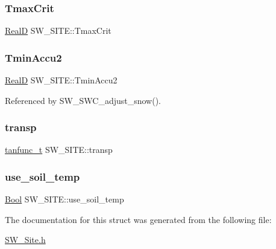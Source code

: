 \subsubsection{\texorpdfstring{Tmax\+Crit}{TmaxCrit}}
{\footnotesize\ttfamily \hyperlink{generic_8h_af1c105fd5732f70b91ddaeda0cc340e3}{RealD} S\+W\+\_\+\+S\+I\+T\+E\+::\+Tmax\+Crit}

\mbox{\label{struct_s_w___s_i_t_e_a5de1acbbf63fde3374e3c9dadfbf8e68}} 
\subsubsection{\texorpdfstring{Tmin\+Accu2}{TminAccu2}}
{\footnotesize\ttfamily \hyperlink{generic_8h_af1c105fd5732f70b91ddaeda0cc340e3}{RealD} S\+W\+\_\+\+S\+I\+T\+E\+::\+Tmin\+Accu2}



Referenced by S\+W\+\_\+\+S\+W\+C\+\_\+adjust\+\_\+snow().

\mbox{\label{struct_s_w___s_i_t_e_a1762feaaded27252b000f391a5d3259c}} 
\subsubsection{\texorpdfstring{transp}{transp}}
{\footnotesize\ttfamily \hyperlink{structtanfunc__t}{tanfunc\+\_\+t} S\+W\+\_\+\+S\+I\+T\+E\+::transp}

\mbox{\label{struct_s_w___s_i_t_e_ac833a8e8b0064ae71f4c9e5afbac3e2a}} 
\subsubsection{\texorpdfstring{use\+\_\+soil\+\_\+temp}{use\_soil\_temp}}
{\footnotesize\ttfamily \hyperlink{generic_8h_a39db6982619d623273fad8a383489309}{Bool} S\+W\+\_\+\+S\+I\+T\+E\+::use\+\_\+soil\+\_\+temp}



The documentation for this struct was generated from the following file\+:\begin{DoxyCompactItemize}
\item 
\hyperlink{_s_w___site_8h}{S\+W\+\_\+\+Site.\+h}\end{DoxyCompactItemize}
